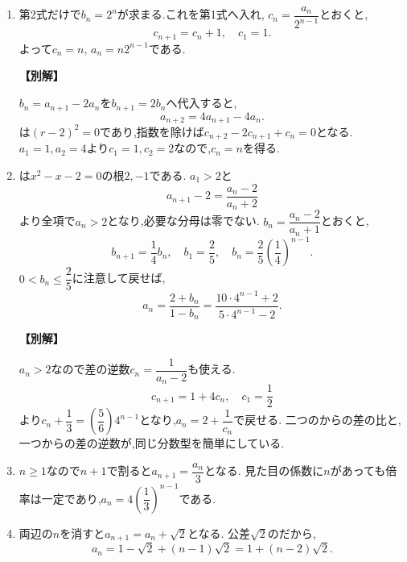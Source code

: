 \begin{enumerate}[label=\textbf{問\arabic*.},leftmargin=3.8em,format=\bookitemlink{practice-basic}{solution}{problem}]
          \item 第2式だけで$b_n=2^n$が求まる.これを第1式へ入れ,
                  $c_n=\dfrac{a_n}{2^{n-1}}$とおくと,
                  \[
                    c_{n+1}=c_n+1,\quad c_1=1.
                  \]
                  よって$c_n=n$, $a_n=n2^{n-1}$である.
                  \par\smallskip\noindent\textbf{【別解】}\par
                  $b_n=a_{n+1}-2a_n$を$b_{n+1}=2b_n$へ代入すると,
                  \[
                    a_{n+2}=4a_{n+1}-4a_n.
                  \]
                  は$(r-2)^2=0$であり,指数を除けば$c_{n+2}-2c_{n+1}+c_n=0$となる.
                  $a_1=1,a_2=4$より$c_1=1,c_2=2$なので,$c_n=n$を得る.

          \item {}は$x^2-x-2=0$の根$2,-1$である.
                  $a_1>2$と
                  \[
                    a_{n+1}-2=\frac{a_n-2}{a_n+2}
                  \]
                  より全項で$a_n>2$となり,必要な分母は零でない.
                  $b_n=\dfrac{a_n-2}{a_n+1}$とおくと,
                  \[
                    b_{n+1}=\frac14b_n,\quad b_1=\frac25,
                    \quad b_n=\frac25\left(\frac14\right)^{n-1}.
                  \]
                  $0<b_n\le\dfrac{2}{5}$に注意して戻せば,
                  \[
                    a_n=\frac{2+b_n}{1-b_n}
                       =\frac{10\cdot4^{n-1}+2}{5\cdot4^{n-1}-2}.
                  \]
                  \par\smallskip\noindent\textbf{【別解】}\par
                  $a_n>2$なので差の逆数$c_n=\dfrac{1}{a_n-2}$も使える.
                  \[
                    c_{n+1}=1+4c_n,\quad c_1=\frac12
                  \]
                  より$c_n+\dfrac{1}{3}=\left(\dfrac{5}{6}\right)4^{n-1}$となり,$a_n=2+\dfrac{1}{c_n}$で戻せる.
                  二つのからの差の比と,一つからの差の逆数が,同じ分数型を簡単にしている.

          \item $n\ge1$なので$n+1$で割ると$a_{n+1}=\dfrac{a_n}{3}$となる.
                  見た目の係数に$n$があっても倍率は一定であり,$a_n=4\left(\dfrac{1}{3}\right)^{n-1}$である.

          \item 両辺の$n$を消すと$a_{n+1}=a_n+\sqrt2$となる.
                  公差$\sqrt2$のだから,
                  \[
                    a_n=1-\sqrt2+(n-1)\sqrt2=1+(n-2)\sqrt2.
                  \]


\end{enumerate}
